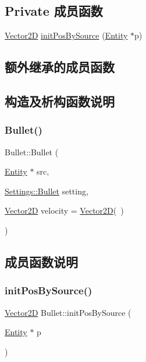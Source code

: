 \subsection*{Private 成员函数}
\begin{DoxyCompactItemize}
\item 
\hyperlink{_vector2_d_8hpp_aa1f1145650f1dd9bddf7335ec6434d7c}{Vector2D} \hyperlink{class_bullet_ac8350c88346ae354e7144fa20b6cb2a2}{init\+Pos\+By\+Source} (\hyperlink{class_entity}{Entity} $\ast$p)
\end{DoxyCompactItemize}
\subsection*{额外继承的成员函数}


\subsection{构造及析构函数说明}
\mbox{\label{class_bullet_ae9b56731be2ca3ff77f3a3ee4eb0bd25}} 
\subsubsection{\texorpdfstring{Bullet()}{Bullet()}}
{\footnotesize\ttfamily Bullet\+::\+Bullet (\begin{DoxyParamCaption}\item[{\hyperlink{class_entity}{Entity} $\ast$}]{src,  }\item[{\hyperlink{struct_settings_1_1_bullet}{Settings\+::\+Bullet}}]{setting,  }\item[{\hyperlink{_vector2_d_8hpp_aa1f1145650f1dd9bddf7335ec6434d7c}{Vector2D}}]{velocity = {\ttfamily \hyperlink{_vector2_d_8hpp_aa1f1145650f1dd9bddf7335ec6434d7c}{Vector2D}(~)} }\end{DoxyParamCaption})}



\subsection{成员函数说明}
\mbox{\label{class_bullet_ac8350c88346ae354e7144fa20b6cb2a2}} 
\subsubsection{\texorpdfstring{init\+Pos\+By\+Source()}{initPosBySource()}}
{\footnotesize\ttfamily \hyperlink{_vector2_d_8hpp_aa1f1145650f1dd9bddf7335ec6434d7c}{Vector2D} Bullet\+::init\+Pos\+By\+Source (\begin{DoxyParamCaption}\item[{\hyperlink{class_entity}{Entity} $\ast$}]{p }\end{DoxyParamCaption})\hspace{0.3cm}{\ttfamily [private]}}

